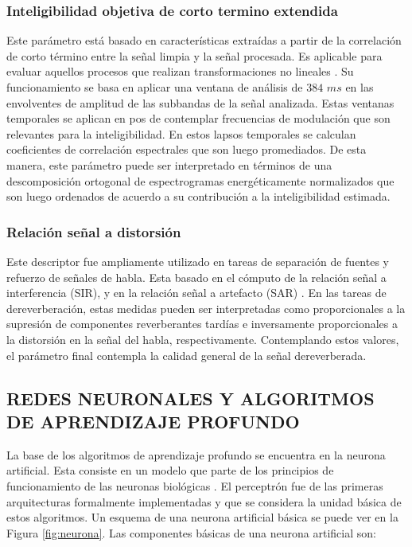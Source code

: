\subsubsection{Inteligibilidad objetiva de corto termino extendida}
Este parámetro está basado en características extraídas a partir de la correlación de corto término entre la señal limpia y la señal procesada. Es aplicable para evaluar aquellos procesos que realizan transformaciones no lineales \cite{ESTOI}. Su funcionamiento se basa en aplicar una ventana de análisis de $384$ $ms$ en las envolventes de amplitud de las subbandas de la señal analizada. Estas ventanas temporales se aplican en pos de contemplar frecuencias de modulación que son relevantes para la inteligibilidad. En estos lapsos temporales se calculan coeficientes de correlación espectrales que son luego promediados. De esta manera, este parámetro puede ser interpretado en términos de una descomposición ortogonal de espectrogramas energéticamente normalizados que son luego ordenados de acuerdo a su contribución a la inteligibilidad estimada. 

\subsubsection{Relación señal a distorsión}

Este descriptor fue ampliamente utilizado en tareas de separación de fuentes y refuerzo de señales de habla. Esta basado en el cómputo de la relación señal a interferencia (SIR), y en la relación señal a artefacto (SAR) \cite{SAR}. En las tareas de dereverberación, estas medidas pueden ser interpretadas como proporcionales a la supresión de componentes reverberantes tardías e inversamente proporcionales a la distorsión en la señal del habla, respectivamente. Contemplando estos valores, el parámetro final contempla la calidad general de la señal dereverberada.  

\subsection[Redes neuronales y algoritmos de aprendizaje profundo]{REDES NEURONALES Y ALGORITMOS DE APRENDIZAJE PROFUNDO}

La base de los algoritmos de aprendizaje profundo se encuentra en la neurona artificial. Esta consiste en un modelo que parte de los principios de funcionamiento de las neuronas biológicas \cite{neurona}. El perceptrón \cite{perceptron} fue de las primeras arquitecturas formalmente implementadas y que se considera la unidad básica de  estos algoritmos. Un esquema de una neurona artificial básica se puede ver en la Figura \ref{fig:neurona}. Las componentes básicas de una neurona artificial son: 

